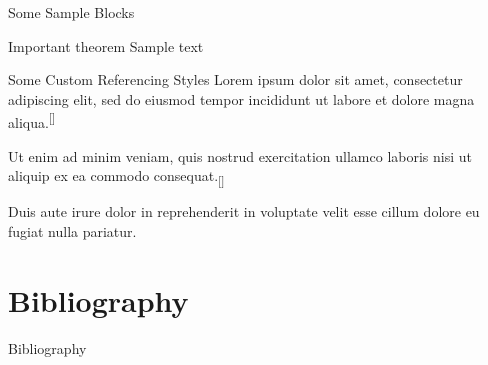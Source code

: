 \documentclass[10pt, aspectratio=169]{beamer}
\newcommand{\cpsh}[2][]{\textsuperscript{\fontsize{6}{6}\textcolor{mzescyan}{[{#1}\citealp[]{#2}]}}}
\newcommand{\cpsl}[2][]{\textsubscript{\fontsize{6}{6}\textcolor{mzescyan}{[{#1}\citealp[]{#2}]}}}
\newcommand{\csh}[2][]{\textsuperscript{\fontsize{6}{6}\textcolor{mzescyan}{[{#1}\citealp[]{#2};}}}
\newcommand{\csl}[2]{\textsubscript{\fontsize{6}{6}\textcolor{mzescyan}{\hphantom{[{#2}}\citealp{#1}]}}}
\newcommand{\cpshl}[3][]{\textcolor{mzescyan}{\rlap{\csh[#1]{#2}}{\csl{#3}{#1}}}}
\begin{document}
{\begin{frame}{Some Sample Blocks}
		\begin{alertblock}{Important theorem}
			Sample text
		\end{alertblock}
	\end{frame}
	
	\begin{frame}{Some Custom Referencing Styles}
	Lorem ipsum dolor sit amet, consectetur adipiscing elit, sed do eiusmod tempor incididunt ut labore et dolore magna aliqua.\cpsh{Downs1957c} 
	
	Ut enim ad minim veniam, quis nostrud exercitation ullamco laboris nisi ut aliquip ex ea commodo consequat.\cpsl{Stokes1963} 
	
	Duis aute irure dolor in reprehenderit in voluptate velit esse cillum dolore eu fugiat nulla pariatur.\cpshl[e.g. ]{KKV, Greene2003, Greene2012}{Wooldridge2002, Gelman2007} 
	
	\end{frame}
	
	\section{Bibliography}
	\begin{frame}[allowframebreaks]{Bibliography}
	\printbibliography[heading=none]
	\end{frame}
}
\end{document}
